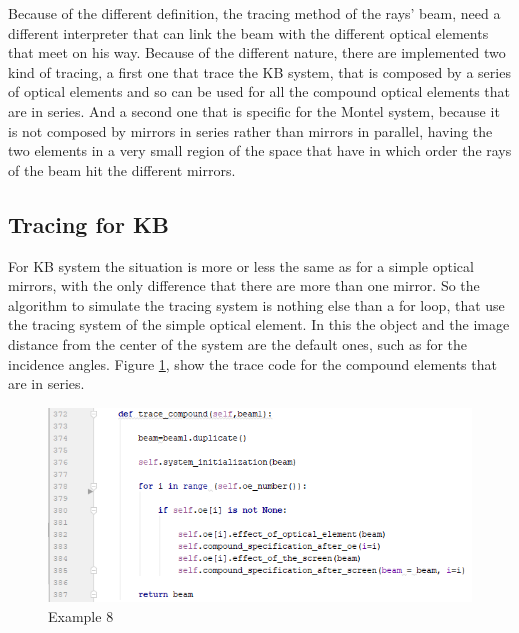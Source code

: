 Because of the different definition, the tracing method of the rays' beam, need a different interpreter that can link the beam with the different optical elements that meet on his way. Because of the different nature, there are implemented two kind of tracing, a first one that trace the KB system, that is composed by a series of optical elements and so can be used for all the compound optical elements that are in series. And a second one that is specific for the Montel system, because it is not composed by mirrors in series rather than mirrors in parallel, having the two elements in a very small region of the space that have in which order the rays of the beam hit the different mirrors.
\subsection{Tracing for KB}
For KB system the situation is more or less the same as for a simple optical mirrors, with the only difference that there are more than one mirror. So the algorithm to simulate the tracing system is nothing else than a for loop, that use the tracing system of the simple optical element. In this the object and the image distance from the center of the system are the default ones, such as for the incidence angles. Figure \ref{fig: CodeTraceCompund}, show the trace code for the compound elements that are in series.
\begin{figure}[H]
%
\centering
%
\includegraphics[width=1.\textwidth]{Immagini/Chapter3/CodeTraceCompound}
%
\caption{Example 8}
%
\label{fig: CodeTraceCompund}
%
\end{figure}
